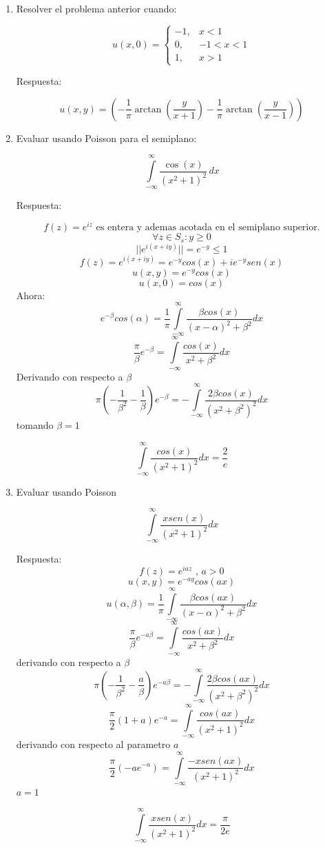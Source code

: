 \documentclass[a4paper,12pt]{article}
\begin{document}
\begin{enumerate}
\[
= \frac{1}{\pi} \left[ \lim_{p \to -\infty} -\arctan \left( \frac{a - x}{y} \right) \bigg|_{p}^{0} + \lim_{q \to \infty} \arctan \left( \frac{a - x}{y} \right) \bigg|_{0}^{q} \right]
\]

Se pudo haber hallado $v(x, y)$ que también es armónica.

\item Resolver el problema anterior cuando:

\[
u(x, 0) = \begin{cases}
-1, & x < 1 \\
0, & -1 < x < 1 \\
1, & x > 1
\end{cases}
\]

Respuesta:

\[
u(x, y) = \left( -\frac{1}{\pi} \arctan \left( \frac{y}{x + 1} \right) - \frac{1}{\pi} \arctan \left( \frac{y}{x - 1} \right) \right)
\]

\item Evaluar usando Poisson para el semiplano:

\[
\int\limits_{-\infty}^{\infty} \frac{\cos(x)}{(x^2 + 1)^2} \,dx
\]

Respuesta:

\[
f(z)=e^{iz} \text{ es entera y ademas acotada en el semiplano superior.}
\]
\[
\forall z \in S_s : y \geq 0
\]
\[
||e^{i(x+iy)}||= e^{-y} \leq 1
\]
\[
f(z)=e^{i(x+iy)}=e^{-y}cos(x)+ ie^{-y}sen(x)
\]
\[
u(x,y)=e^{-y}cos(x)
\]
\[
u(x,0)=cos(x)
\]
Ahora:
\[
e^{-\beta}cos(\alpha)=\frac{1}{\pi}\int\limits_{-\infty}^{\infty} \frac{\beta cos(x)}{(x-\alpha)^2+\beta^2}dx
\]
\[
\frac{\pi}{\beta} e^{-\beta}=\int\limits_{-\infty}^{\infty} \frac{cos(x)}{x^2+\beta^2}dx
\]
Derivando con respecto a $\beta$
\[
\pi (-\frac{1}{\beta^2}- \frac{1}{\beta})e^{-\beta}=- \int\limits_{-\infty}^{\infty} \frac{2\beta cos(x)}{(x^2 + \beta^2)^2}dx
\]
tomando $\beta=1$

\[
\int\limits_{-\infty}^{\infty} \frac{cos(x)}{(x^2+1)^2}dx=\frac{2}{e}
\]


\item Evaluar usando Poisson

\[
\int\limits_{-\infty}^{\infty} \frac{x 
 sen(x)}{(x^2 + 1)^2} dx
\]

Respuesta:
\[
f(z)=e^{iaz} \text{   ,   }a > 0
\]
\[
u(x,y)= e^{-ay}cos(ax)
\]
\[
u(\alpha,\beta)=\frac{1}{\pi}\int\limits_{-\infty}^{\infty}\frac{\beta cos(ax)}{(x-\alpha)^2+\beta^2}dx
\]
\[
\frac{\pi}{\beta}e^{-a\beta}=\int\limits_{-\infty}^{\infty}\frac{cos(ax)}{x^2+ \beta^2}dx
\]
derivando con respecto a $\beta$
\[
\pi(-\frac{1}{\beta^2}-\frac{a}{\beta})e^{-a\beta}=-\int\limits_{-\infty}^{\infty}\frac{2\beta cos(ax)}{(x^2+\beta^2)^2}dx
\]
\[
\frac{\pi}{2}(1+a)e^{-a}= \int\limits_{-\infty}^{\infty}\frac{cos(ax)}{(x^2+1)^2}dx
\]
derivando con respecto al parametro $a$
\[
\frac{\pi}{2}(-ae^{-a})=\int\limits_{-\infty}^{\infty}\frac{-xsen(ax)}{(x^2+1)^2}dx
\]
$a=1$

\[
\int\limits_{-\infty}^{\infty}\frac{x sen(x)}{(x^2+1)^2}dx=\frac{\pi}{2e}
\]






\end{enumerate}
\end{document}
